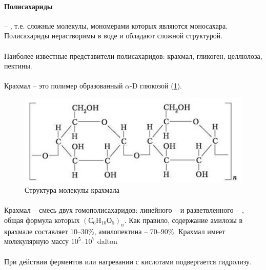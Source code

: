 \paragraph*{Полисахариды} -- , т.е. сложные молекулы, мономерами которых являются моносахара. Полисахариды нерастворимы в воде и обладают сложной структурой.

\paragraph*{}Наиболее известные представители полисахаридов: \hypertarget{krahmal}{крахмал}, гликоген, \hypertarget{cellulosa}{целлюлоза}, пектины.

\paragraph*{}Крахмал -- это полимер образованный $\alpha$-D глюкозой (\ris \ref{krahmal_mol}).  	

\begin{figure}[h!]
  \centering
       \includegraphics[width=0.5\linewidth]{pictures/krahmal_mol}
\caption{Структура молекулы крахмала}
\label{krahmal_mol}
\end{figure}

\paragraph*{}Крахмал -- смесь двух гомополисахаридов: линейного --  и разветвленного -- , общая формула которых $(С_{6}Н_{10}О_{5})_{n}$. Как правило, содержание амилозы в крахмале составляет 10–30\%, амилопектина – 70–90\%. Крахмал имеет молекулярную массу $10^{5}–10^{7}$ \gls{dalton}

\paragraph*{}При действии ферментов или нагревании с кислотами подвергается гидролизу. 

